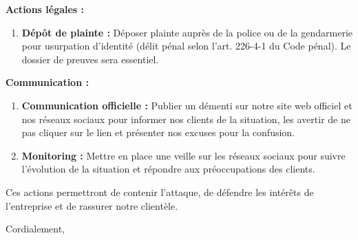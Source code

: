 \documentclass[12pt,a4paper]{article}
\begin{document}
\textbf{Actions légales :} 
\begin{enumerate}
    	\item \textbf{Dépôt de plainte :} Déposer plainte auprès de la police ou de la gendarmerie pour usurpation d'identité (délit pénal selon l'art. 226-4-1 du Code pénal). Le dossier de preuves sera essentiel.
\end{enumerate}

\textbf{Communication :} 
\begin{enumerate}
    	\item \textbf{Communication officielle :} Publier un démenti sur notre site web officiel et nos réseaux sociaux pour informer nos clients de la situation, les avertir de ne pas cliquer sur le lien et présenter nos excuses pour la confusion.
    	\item \textbf{Monitoring :} Mettre en place une veille sur les réseaux sociaux pour suivre l'évolution de la situation et répondre aux préoccupations des clients.
\end{enumerate}

Ces actions permettront de contenir l'attaque, de défendre les intérêts de l'entreprise et de rassurer notre clientèle.

Cordialement,
\end{document}

